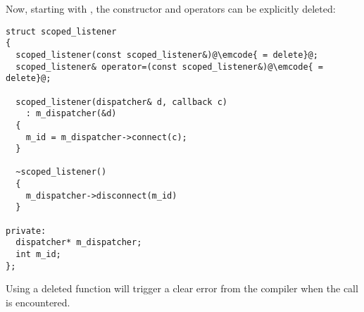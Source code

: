 \solutiontitle

Now, starting with , the constructor and operators can be
explicitly deleted:

\begin{lstlisting}
struct scoped_listener
{
  scoped_listener(const scoped_listener&)@\emcode{ = delete}@;
  scoped_listener& operator=(const scoped_listener&)@\emcode{ = delete}@;

  scoped_listener(dispatcher& d, callback c)
    : m_dispatcher(&d)
  {
    m_id = m_dispatcher->connect(c);
  }

  ~scoped_listener()
  {
    m_dispatcher->disconnect(m_id)
  }

private:
  dispatcher* m_dispatcher;
  int m_id;
};
\end{lstlisting}

Using a deleted function will trigger a clear error from the compiler
when the call is encountered.
